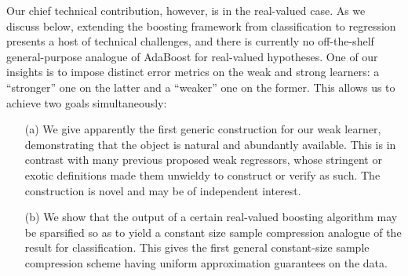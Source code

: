 Our chief technical contribution, however, is in the real-valued case.
As we discuss below, extending the boosting framework from classification to regression
presents a host of technical challenges, and there is currently no off-the-shelf
general-purpose analogue of AdaBoost for real-valued hypotheses.
One of our insights is to impose distinct error metrics on the weak and strong learners:
a ``stronger'' one on the latter and a ``weaker'' one on the former.
This allows us to achieve
two
goals simultaneously:
\begin{itemize}
\item[(a)]
  We give apparently the first generic construction for our weak learner,
  demonstrating that the object is natural and abundantly available. This is in contrast with
  many previous proposed weak regressors, whose stringent or exotic definitions made them
  unwieldy
  to construct or verify as such. The construction is novel and may be of independent interest.
\item[(b)]
  We show that the output of a certain real-valued boosting algorithm may be sparsified so as to yield a constant size sample compression
  analogue of the
  \citeauthor{DBLP:journals/jacm/MoranY16} result for classification.
  This gives the first general constant-size sample compression scheme having uniform approximation guarantees on the data. %
\end{itemize}






